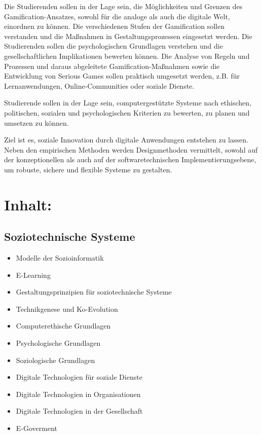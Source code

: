 Die Studierenden sollen in der Lage sein, die Möglichkeiten und Grenzen
des Gamification-Ansatzes, sowohl für die analoge als auch die digitale
Welt, einordnen zu können. Die verschiedenen Stufen der Gamification
sollen verstanden und die Maßnahmen in Gestaltungsprozessen eingesetzt
werden. Die Studierenden sollen die psychologischen Grundlagen verstehen
und die gesellschaftlichen Implikationen bewerten können. Die Analyse
von Regeln und Prozessen und daraus abgeleitete Gamification-Maßnahmen
sowie die Entwicklung von Serious Games sollen praktisch umgesetzt
werden, z.B. für Lernanwendungen, Online-Communities oder soziale
Dienste.

Studierende sollen in der Lage sein, computergestützte Systeme nach
ethischen, politischen, sozialen und psychologischen Kriterien zu
bewerten, zu planen und umsetzen zu können.

Ziel ist es, soziale Innovation durch digitale Anwendungen entstehen zu
lassen. Neben den empirischen Methoden werden Designmethoden vermittelt,
sowohl auf der konzeptionellen als auch auf der softwaretechnischen
Implementierungsebene, um robuste, sichere und flexible Systeme zu
gestalten.

\section*{Inhalt:}\label{inhalt-27}

\subsection*{Soziotechnische Systeme}\label{soziotechnische-systeme-1}

\begin{itemize}
\tightlist
\item
  Modelle der Sozioinformatik
\item
  E-Learning
\item
  Gestaltungsprinzipien für soziotechnische Systeme
\item
  Technikgenese und Ko-Evolution
\item
  Computerethische Grundlagen
\item
  Psychologische Grundlagen
\item
  Soziologische Grundlagen
\item
  Digitale Technologien für soziale Dienste
\item
  Digitale Technologien in Organisationen
\item
  Digitale Technologien in der Gesellschaft
\item
  E-Goverment
\end{itemize}

